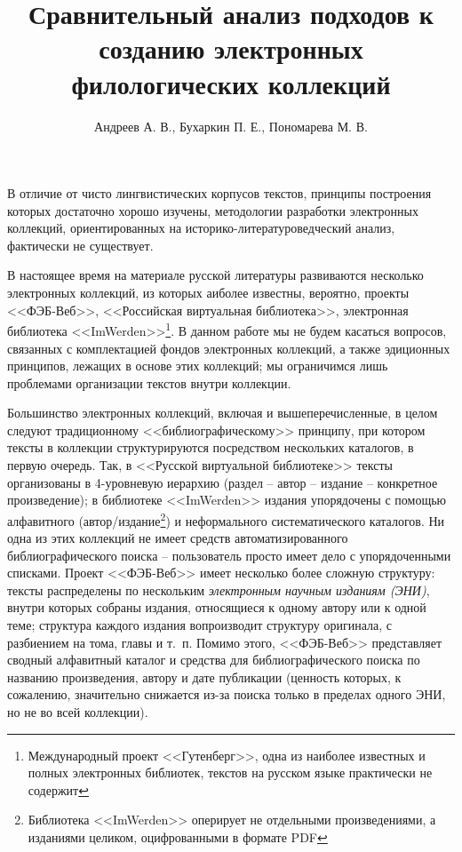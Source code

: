 \documentclass[12pt]{article}
\begin{document}
\title{Сравнительный анализ подходов к созданию электронных филологических коллекций}
\author{Андреев А. В., Бухаркин П. Е., Пономарева М. В.}
\maketitle

В отличие от чисто лингвистических корпусов текстов, принципы построения которых достаточно хорошо
изучены, методологии разработки электронных коллекций, ориентированных на
историко-литературоведческий анализ, фактически не существует. 

В настоящее время на материале русской литературы развиваются несколько электронных коллекций, из
которых аиболее известны, вероятно, проекты <<ФЭБ-Веб>>, <<Российская виртуальная библиотека>>, 
электронная библиотека <<ImWerden>>\footnote{Международный проект <<Гутенберг>>,
одна из наиболее известных и полных электронных библиотек, текстов на русском языке практически не
содержит}. В данном работе мы не будем касаться вопросов, связанных с комплектацией фондов электронных
коллекций, а также эдиционных принципов, лежащих в основе этих коллекций; мы ограничимся лишь проблемами
организации текстов внутри коллекции.

Большинство электронных коллекций, включая и вышеперечисленные, в целом следуют традиционному <<библиографическому>> 
принципу, при котором тексты в коллекции структурируются посредством нескольких каталогов,
в первую очередь. Так, в <<Русской виртуальной библиотеке>> тексты организованы в 4-уровневую иерархию
(раздел -- автор -- издание -- конкретное произведение); в библиотеке <<ImWerden>> издания упорядочены с
помощью алфавитного (автор/издание\footnote{Библиотека <<ImWerden>> оперирует не отдельными произведениями,
а изданиями целиком, оцифрованными в формате PDF}) и неформального систематического каталогов. Ни одна из этих коллекций
не имеет средств автоматизированного библиографического поиска -- пользователь просто имеет дело с упорядоченными
списками. Проект <<ФЭБ-Веб>> имеет несколько более сложную структуру: тексты распределены по нескольким \emph{электронным
научным изданиям (ЭНИ)}, внутри которых собраны издания, относящиеся к одному автору или к одной теме; структура каждого издания
вопроизводит структуру оригинала, с разбиением на тома, главы и т.~п. Помимо этого, <<ФЭБ-Веб>> представляет сводный
алфавитный каталог и средства для библиографического поиска по названию произведения, автору и дате публикации (ценность
которых, к сожалению, значительно снижается из-за поиска только в пределах одного ЭНИ, но не во всей коллекции).
\end{document}
